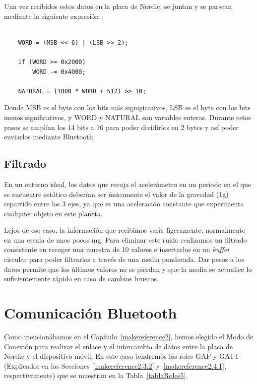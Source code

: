 Una vez recibidos estos datos en la placa de Nordic, se juntan y se parsean  mediante la siguiente expresión :

\begin{lstlisting}[frame=single]

	WORD = (MSB << 6) | (LSB >> 2);
	
	if (WORD >= 0x2000)
		WORD -= 0x4000;

	NATURAL = (1000 * WORD + 512) >> 10;

\end{lstlisting}

Donde MSB es el byte con los bits más signigicativos, LSB es el byte con los bits menos significativos, y WORD y NATURAL son variables enteras. Durante estos pasos se amplían los 14 bits a 16 para poder dividirlos en 2 bytes y así poder enviarlos mediante Bluetooth.

\subsection{Filtrado}
\label{makereference5.4.2}

En un entorno ideal, los datos que recoja el acelerómetro en un período en el que se encuentre estático deberían ser únicamente el valor de la gravedad (1g) repartido entre los 3 ejes, ya que es una aceleración constante que experimenta cualquier objeto en este planeta.

Lejos de ese caso, la información que recibimos varía ligeramente, normalmente en una escala de unos pocos mg. Para eliminar este ruido realizamos un filtrado consistente en recoger una muestra de 10 valores e insertarlos en un \emph{buffer} circular para poder filtrarlos a través de una media ponderada. Dar pesos a los datos permite que los últimos valores no se pierdan y que la media se actualice lo suficientemente rápido en caso de cambios bruscos.

\section{Comunicación Bluetooth}
\label{makereference5.2}

Como mencionábamos en el Capítulo~\ref{makereference2}, hemos elegido el Modo de Conexión para realizar el enlace y el intercambio de datos entre la placa de Nordic y el dispositivo móvil. En este caso tendremos los roles GAP y GATT (Explicados en las Secciones~\ref{makereference2.3.2} y~\ref{makereference2.4.1}, respectivamente) que se muestran en la Tabla~\ref{tablaRoles5}. 

